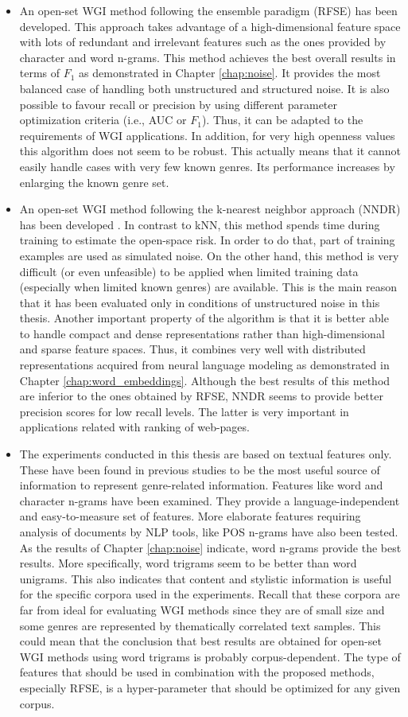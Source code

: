 \begin{itemize}
    \item An open-set WGI method following the ensemble paradigm (RFSE) has been developed. This approach takes advantage of a high-dimensional feature space with lots of redundant and irrelevant features such as the ones provided by character and word n-grams. This method achieves the best overall results in terms of $F_1$ as demonstrated in Chapter \ref{chap:noise}. It provides the most balanced case of handling both unstructured and structured noise. It is also possible to favour recall or precision by using different parameter optimization criteria (i.e., AUC or $F_1$). Thus, it can be adapted to the requirements of WGI applications. In addition, for very high openness values this algorithm does not seem to be robust. This actually means that it cannot easily handle cases with very few known genres. Its performance increases by enlarging the known genre set. 
    \item An open-set WGI method following the k-nearest neighbor approach (NNDR) has been developed . In contrast to kNN, this method spends time during training to estimate the open-space risk. In order to do that, part of training examples are used as simulated noise. On the other hand, this method is very difficult (or even unfeasible) to be applied when limited training data (especially when limited known genres) are available. This is the main reason that it has been evaluated only in conditions of unstructured noise in this thesis. Another important property of the algorithm is that it is better able to handle compact and dense representations rather than high-dimensional and sparse feature spaces. Thus, it combines very well with distributed representations acquired from neural language modeling as demonstrated in Chapter \ref{chap:word_embeddings}. Although the best results of this method are inferior to the ones obtained by RFSE, NNDR seems to provide better precision scores for low recall levels. The latter is very important in applications related with ranking of web-pages.
    \item The experiments conducted in this thesis are based on textual features only. These have been found in previous studies to be the most useful source of information to represent genre-related information. Features like word and character n-grams have been examined. They provide a language-independent and easy-to-measure set of features. More elaborate features requiring analysis of documents by NLP tools, like POS n-grams have also been tested. As the results of Chapter \ref{chap:noise} indicate, word n-grams provide the best results. More specifically, word trigrams seem to be better than word unigrams. This also indicates that content and stylistic information is useful for the specific corpora used in the experiments. Recall that these corpora are far from ideal for evaluating WGI methods since they are of small size and some genres are represented by thematically correlated text samples. This could mean that the conclusion that best results are obtained for open-set WGI methods using word trigrams is probably corpus-dependent. The type of features that should be used in combination with the proposed methods, especially RFSE, is a hyper-parameter that should be optimized for any given corpus.

\end{itemize}
